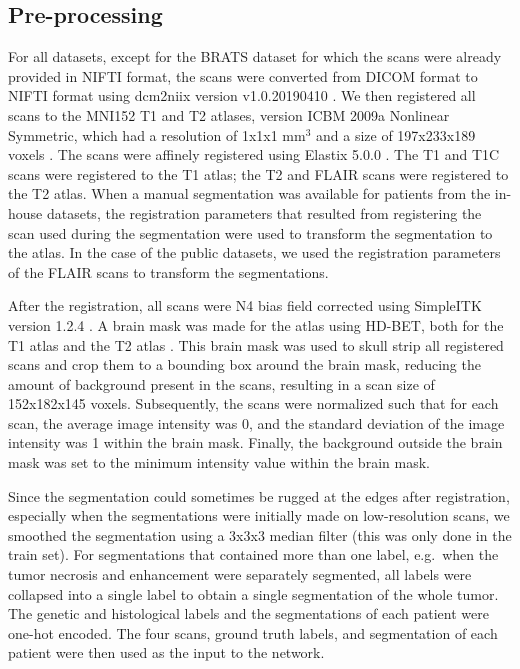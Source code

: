 \subsection{Pre-processing}
For all datasets, except for the \gls{BRATS} dataset for which the scans were already provided in \acrshort{NIFTI} format, the scans were converted from DICOM format to \acrshort{NIFTI} format using dcm2niix version v1.0.20190410 \autocite{li2016dcmniix}.
We then registered all scans to the MNI152 \gls{T1} and \gls{T2} atlases, version ICBM 2009a Nonlinear Symmetric, which had a resolution of 1x1x1 mm$^3$ and a size of 197x233x189 voxels \autocite{fonov2011unbiased, fonov2009unbiased}.
The scans were affinely registered using Elastix 5.0.0 \autocite{klein2010elastix, shamonin2014fast}.
The \gls{T1} and \gls{T1C} scans were registered to the \gls{T1} atlas; the \gls{T2} and \gls{FLAIR} scans were registered to the \gls{T2} atlas.
When a manual segmentation was available for patients from the in-house datasets, the registration parameters that resulted from registering the scan used during the segmentation were used to transform the segmentation to the atlas.
In the case of the public datasets, we used the registration parameters of the \gls{FLAIR} scans to transform the segmentations.

After the registration, all scans were N4 bias field corrected using SimpleITK version 1.2.4 \autocite{lowekamp2013simpleitk}.
A brain mask was made for the atlas using HD-BET, both for the \gls{T1} atlas and the \gls{T2} atlas \autocite{isensee2019hdbet}.
This brain mask was used to skull strip all registered scans and crop them to a bounding box around the brain mask, reducing the amount of background present in the scans, resulting in a scan size of 152x182x145 voxels.
Subsequently, the scans were normalized such that for each scan, the average image intensity was 0, and the standard deviation of the image intensity was 1 within the brain mask.
Finally, the background outside the brain mask was set to the minimum intensity value within the brain mask.

Since the segmentation could sometimes be rugged at the edges after registration, especially when the segmentations were initially made on low-resolution scans, we smoothed the segmentation using a 3x3x3 median filter (this was only done in the train set).
For segmentations that contained more than one label, e.g.\ when the \gls{tumor} necrosis and enhancement were separately segmented, all labels were collapsed into a single label to obtain a single segmentation of the whole \gls{tumor}.
The genetic and histological labels and the segmentations of each patient were one-hot encoded.
The four scans, ground truth labels, and segmentation of each patient were then used as the input to the network.

